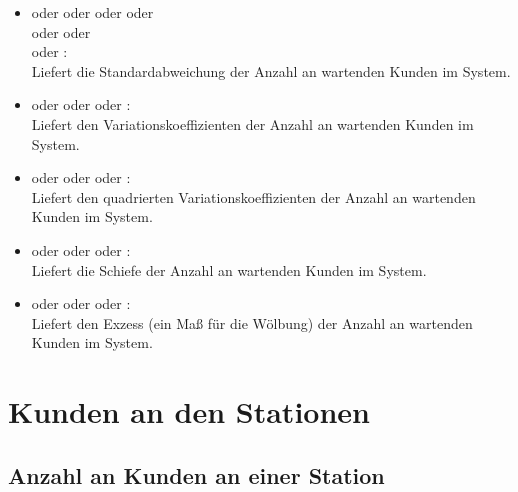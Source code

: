 \begin{itemize}
\item
{} oder  oder  oder  oder\\
 oder  oder\\
 oder :\\
Liefert die Standardabweichung der Anzahl an wartenden Kunden im System.

\item
{} oder  oder  oder :\\
Liefert den Variationskoeffizienten der Anzahl an wartenden Kunden im System.

\item
{} oder  oder  oder :\\
Liefert den quadrierten Variationskoeffizienten der Anzahl an wartenden Kunden im System.

\item
{} oder  oder  oder :\\
Liefert die Schiefe der Anzahl an wartenden Kunden im System.

\item
{} oder  oder  oder :\\
Liefert den Exzess (ein Maß für die Wölbung) der Anzahl an wartenden Kunden im System.

\end{itemize}





\section{Kunden an den Stationen}



\subsection{Anzahl an Kunden an einer Station}

